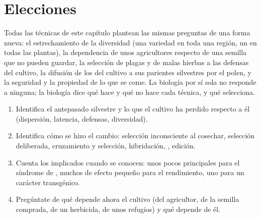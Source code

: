 \section{Elecciones}

\begin{proposition}\label{prop:g12:domesticated-plants:stakes}
Todas las técnicas de este capítulo plantean las mismas preguntas de
una forma nueva: el estrechamiento de la diversidad (una variedad en
toda una región, un  en todas las plantas), la dependencia de unos
agricultores respecto de una semilla que no pueden guardar, la
selección de plagas y de malas hierbas  a las defensas del
cultivo, la difusión de los  del cultivo a sus parientes
silvestres por el polen, y la seguridad y la propiedad de lo que se
come. La biología por sí sola no responde a ninguna; la biología dice
qué hace y qué no hace cada técnica, y qué selecciona.
\end{proposition}
\admitted

\begin{method}\label{met:g12:domesticated-plants:read}
\begin{enumerate}
  \item Identifica el antepasado silvestre y lo que el cultivo ha
        perdido respecto a él (dispersión, latencia, defensas,
        diversidad).
  \item Identifica cómo se hizo el cambio: selección inconsciente al
        cosechar, selección deliberada, cruzamiento y selección,
        hibridación, , edición.
  \item Cuenta los  implicados cuando se conocen: unos pocos
         principales para el síndrome de , muchos de
        efecto pequeño para el rendimiento, uno para un carácter
        transgénico.
  \item Pregúntate de qué depende ahora el cultivo (del agricultor, de
        la semilla comprada, de un herbicida, de unos refugios) y qué
        depende de él.
\end{enumerate}
\end{method}

